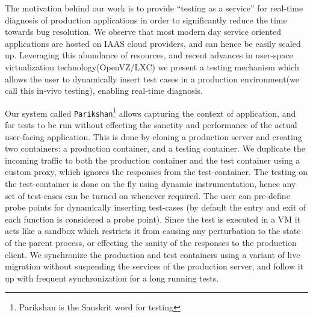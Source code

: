 The motivation behind our work is to provide ``testing as a service'' for real-time diagnosis of production applications in order to significantly reduce the time towards bug resolution.
We observe that most modern day service oriented applications are hosted on IAAS cloud providers, and can hence be easily scaled  up. 
Leveraging this abundance of resources, and recent advances in user-space virtualization technology(OpenVZ/LXC\cite{openvz,linux}) we present a testing mechanism which allows the user to dynamically insert test cases in a production environment(we call this in-vivo testing), enabling real-time diagnosis.

Our system called \texttt{Parikshan}\footnote{Parikshan is the Sanskrit word for testing} allows capturing the context of application, and for tests to be run without effecting the sanctity and performance of the actual user-facing application. 
This is done by cloning a production server and creating two containers: a production container, and a testing container. 
We duplicate the incoming traffic to both the production container and the test container using a custom proxy, which ignores the responses from the test-container. 
The testing on the test-container is done on the fly using dynamic instrumentation, hence any set of test-cases can be turned on whenever required. 
The user can pre-define probe points for dynamically inserting test-cases (by default the entry and exit of each function is considered a probe point).
Since the test is executed in a VM it acts like a sandbox which restricts it from causing any perturbation to the state of the parent process, or effecting the sanity of the responses to the production client. 
We synchronize the production and test containers using a variant of live migration without suspending the services of the production server, and follow it up with frequent synchronization for a long running tests. 

